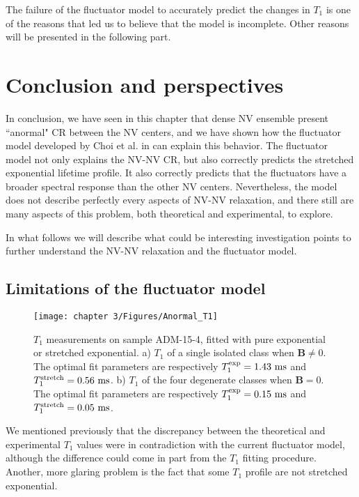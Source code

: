 \documentclass[a4paper, 11pt]{report}
\begin{document}
The failure of the fluctuator model to accurately predict the changes in $T_1$ is one of the reasons that led us to believe that the model is incomplete. Other reasons will be presented in the following part.

\section{Conclusion and perspectives}

In conclusion, we have seen in this chapter that dense NV ensemble present ``anormal" CR between the NV centers, and we have shown how the fluctuator model developed by Choi et al. in \citep{choi2017depolarization} can explain this behavior. The fluctuator model not only explains the NV-NV CR, but also correctly predicts the stretched exponential lifetime profile. It also correctly predicts that the fluctuators have a broader spectral response than the other NV centers. Nevertheless, the model does not describe perfectly every aspects of NV-NV relaxation, and there still are many aspects of this problem, both theoretical and experimental, to explore.

In what follows we will describe what could be interesting investigation points to further understand the NV-NV relaxation and the fluctuator model.

\subsection{Limitations of the fluctuator model}
\begin{figure}[h]
\centering
\texttt{[image: chapter 3/Figures/Anormal\_T1]}
\caption{$T_1$ measurements on sample ADM-15-4, fitted with pure exponential or stretched exponential. a) $T_1$ of a single isolated class when $\mathbf{B} \neq 0$. The optimal fit parameters are respectively $T_1^{\rm exp}=1.43\ \rm ms$ and $T_1^{\rm stretch}=0.56\ \rm ms$. b) $T_1$ of the four degenerate classes when $\mathbf{B}=0$. The optimal fit parameters are respectively $T_1^{\rm exp}=0.15\ \rm ms$ and $T_1^{\rm stretch}=0.05\ \rm ms$.}
\label{anormal T1}
\end{figure}

We mentioned previously that the discrepancy between the theoretical and experimental $T_1$  values were in contradiction with the current fluctuator model, although the difference could come in part from the $T_1$ fitting procedure. Another, more glaring problem is the fact that some $T_1$ profile are not stretched exponential.
\end{document}

